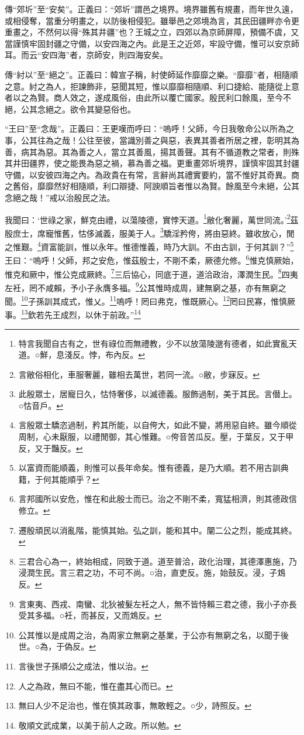 {\noindent\zhuan{}\fzbyks 傳“郊圻”至“安矣”。正義曰：“郊圻”謂邑之境界。境界雖舊有規畫，而年世久遠，或相侵奪，當重分明畫之，以防後相侵犯。雖舉邑之郊境為言，其民田疆畔亦令更重畫之，不然何以得“殊其井疆”也？王城之立，四郊以為京師屏障，預備不虞，又當謹慎牢固封疆之守備，以安四海之內。此是王之近郊，牢設守備，惟可以安京師耳。而云“安四海”者，京師安，則四海安矣。 \par}

{\noindent\zhuan{}\fzbyks 傳“紂以”至“絕之”。正義曰：韓宣子稱，紂使師延作靡靡之樂。“靡靡”者，相隨順之意。紂之為人，拒諫飾非，惡聞其短，惟以靡靡相隨順、利口捷給、能隨從上意者以之為賢。商人效之，遂成風俗，由此所以覆亡國家。殷民利口餘風，至今不絕，公其念絕之。欲令其變惡俗也。 \par}

{\noindent\shu{}\fzkt “王曰”至“念哉”。正義曰：王更嘆而呼曰：“嗚呼！父師，今日我敬命公以所為之事，公其往為之哉！公往至彼，當識別善之與惡，表異其善者所居之裡，彰明其為善，病其為惡。其為善之人，當立其善風，揚其善聲。其有不循道教之常者，則殊其井田疆界，使之能畏為惡之禍，慕為善之福。更重畫郊圻境界，謹慎牢固其封疆守備，以安彼四海之內。為政貴在有常，言辭尚其禮實要約，當不惟好其奇異。商之舊俗，靡靡然好相隨順，利口辯捷、阿諛順旨者惟以為賢。餘風至今未絕，公其念絕之哉！”戒以治殷民之法。 \par}

我聞曰：‘世祿之家，鮮克由禮，以蕩陵德，實悖天道。\footnote{特言我聞自古有之，世有祿位而無禮教，少不以放蕩陵邈有德者，如此實亂天道。○鮮，息淺反。悖，布內反。}敝化奢麗，萬世同流。’\footnote{言敝俗相化，車服奢麗，雖相去萬世，若同一流。○敝，步寐反。}茲殷庶士，席寵惟舊，怙侈滅義，服美于人。\footnote{此殷眾士，居寵日久，怙恃奢侈，以滅德義。服飾過制，美于其民。言僣上。○怙音戶。}驕淫矜侉，將由惡終。雖收放心，閒之惟艱。\footnote{言殷眾士驕恣過制，矜其所能，以自侉大，如此不變，將用惡自終。雖今順從周制，心未厭服，以禮閒御，其心惟難。○侉音苦瓜反。壓，于葉反，又于甲反，又于豔反。}資富能訓，惟以永年。惟德惟義，時乃大訓。不由古訓，于何其訓？”\footnote{以富資而能順義，則惟可以長年命矣。惟有德義，是乃大順。若不用古訓典籍，于何其能順乎？}王曰：“嗚呼！父師，邦之安危，惟茲殷士，不剛不柔，厥德允修。\footnote{言邦國所以安危，惟在和此殷士而已。治之不剛不柔，寬猛相濟，則其德政信修立。}惟克慎厥始，惟克和厥中，惟公克成厥終。\footnote{遷殷頑民以消亂階，能慎其始。弘之訓，能和其中。闡二公之烈，能成其終。}三后協心，同底于道，道洽政治，澤潤生民。\footnote{三君合心為一，終始相成，同致于道。道至普洽，政化治理，其德澤惠施，乃浸潤生民。言三君之功，不可不尚。○治，直吏反。施，始鼓反。浸，子鴆反。}四夷左衽，罔不咸賴，予小子永膺多福。\footnote{言東夷、西戎、南蠻、北狄被髮左衽之人，無不皆恃賴三君之德，我小子亦長受其多福。○衽，而甚反，又而鴆反。}公其惟時成周，建無窮之基，亦有無窮之聞。\footnote{公其惟以是成周之治，為周家立無窮之基業，于公亦有無窮之名，以聞于後世。○為，于偽反。}子孫訓其成式，惟乂。\footnote{言後世子孫順公之成法，惟以治。}嗚呼！罔曰弗克，惟既厥心。\footnote{人之為政，無曰不能，惟在盡其心而已。}罔曰民寡，惟慎厥事。\footnote{無曰人少不足治也，惟在慎其政事，無敢輕之。○少，詩照反。}欽若先王成烈，以休于前政。”\footnote{敬順文武成業，以美于前人之政。所以勉。}


